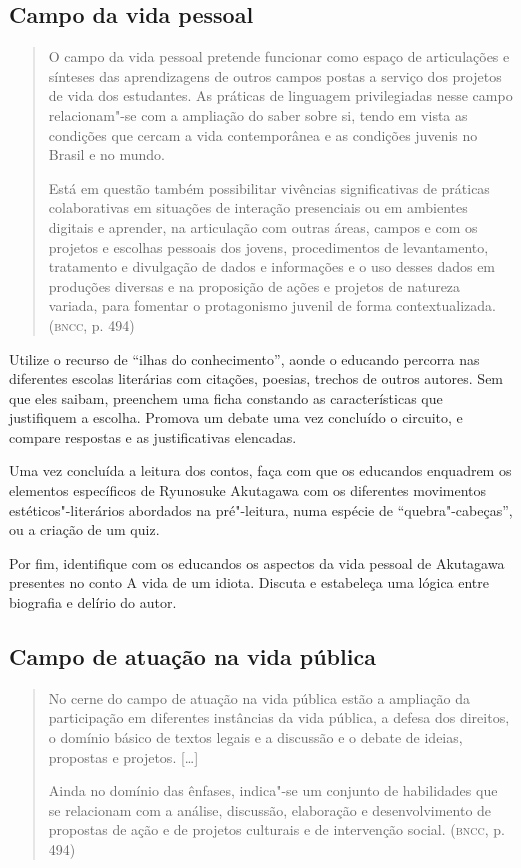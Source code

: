 \documentclass[12pt]{extarticle}
\begin{document}
\subsection{Campo da vida pessoal}

\begin{quote}
O campo da vida pessoal pretende funcionar como espaço de articulações
e sínteses das aprendizagens de outros campos postas a serviço dos
projetos de vida dos estudantes. As práticas de linguagem privilegiadas
nesse campo relacionam"-se com a ampliação do saber sobre si, tendo em
vista as condições que cercam a vida contemporânea e as condições
juvenis no Brasil e no mundo.

Está em questão também possibilitar vivências significativas de práticas
colaborativas em situações de interação presenciais ou em ambientes
digitais e aprender, na articulação com outras áreas, campos e com os
projetos e escolhas pessoais dos jovens, procedimentos de levantamento,
tratamento e divulgação de dados e informações e o uso desses dados em
produções diversas e na proposição de ações e projetos de natureza
variada, para fomentar o protagonismo juvenil de forma
contextualizada. (\textsc{bncc}, p. 494)
\end{quote}

Utilize o recurso de ``ilhas do conhecimento'', aonde o educando
percorra nas diferentes escolas literárias com citações, poesias,
trechos de outros autores. Sem que eles saibam, preenchem uma ficha
constando as características que justifiquem a escolha. Promova um
debate uma vez concluído o circuito, e compare respostas e as
justificativas elencadas.

Uma vez concluída a leitura dos contos, faça com que os educandos
enquadrem os elementos específicos de Ryunosuke Akutagawa com os
diferentes movimentos estéticos"-literários abordados na pré"-leitura,
numa espécie de ``quebra"-cabeças'', ou a criação de um quiz.

Por fim, identifique com os educandos os aspectos da vida pessoal de
Akutagawa presentes no conto A vida de um idiota. Discuta e estabeleça
uma lógica entre biografia e delírio do autor.

\subsection{Campo de atuação na vida pública}

\begin{quote}
No cerne do campo de atuação na vida pública estão a ampliação da
participação em diferentes instâncias da vida pública, a defesa dos
direitos, o domínio básico de textos legais e a discussão e o debate de
ideias, propostas e projetos. {[}\ldots{}{]}

Ainda no domínio das ênfases, indica"-se um conjunto de habilidades que
se relacionam com a análise, discussão, elaboração e desenvolvimento de
propostas de ação e de projetos culturais e de intervenção social.
(\textsc{bncc}, p. 494)
\end{quote}
\end{document}
